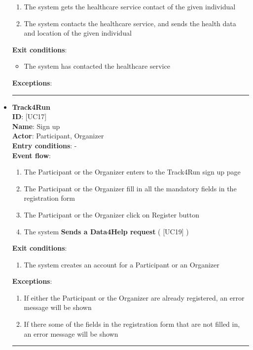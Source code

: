 \documentclass[12pt]{report}
\newcommand\usecase[1]{ [UC#1] }
\begin{document}
\begin{itemize}
\begin{enumerate}
    			\item{The system gets the healthcare service contact of the given individual}
    			\item{The system contacts the healthcare service, and sends the health data and location of the given individual}
  		\end{enumerate}
  	\textbf{Exit conditions}: 
  		\begin{itemize}
  			\item{The system has contacted the healthcare service}
  		\end{itemize}
  	\textbf{Exceptions}: \\
  	\rule{\linewidth}{0.4pt}
  	\item{\textbf{Track4Run}}\\
	\textbf{ID}: \usecase{17} \\
  	\textbf{Name}: Sign up \\
    \textbf{Actor}: Participant, Organizer \\
    \textbf{Entry conditions}: - \\
  	\textbf{Event flow}:
  		\begin{enumerate}
    			\item{The Participant or the Organizer enters to the Track4Run sign up page}
    			\item{The Participant or the Organizer fill in all the mandatory fields in the registration form}
    			\item{The Participant or the Organizer click on Register button}
    			\item{The system \textbf{Sends a Data4Help request} (\usecase{19})}
  		\end{enumerate}
  	\textbf{Exit conditions}:
  		\begin{enumerate}
    			\item{The system creates an account for a Participant or an Organizer}
  		\end{enumerate}
  	\textbf{Exceptions}: 
  		\begin{enumerate}
    			\item{If either the Participant or the Organizer are already registered, an error message will be shown}
    			\item{If there some of the fields in the registration form that are not filled in, an error message will be shown}
  		\end{enumerate}
  	\rule{\linewidth}{0.4pt}

\end{itemize}
\end{document}

